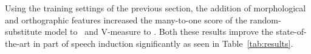 Using the training settings of the previous section, the addition of
morphological and orthographic features increased the many-to-one
score of the random-substitute model to \ftmto\ and V-measure to
\ftvm.  Both these results improve the state-of-the-art in
part of speech induction significantly as seen in
Table~\ref{tab:results}.



